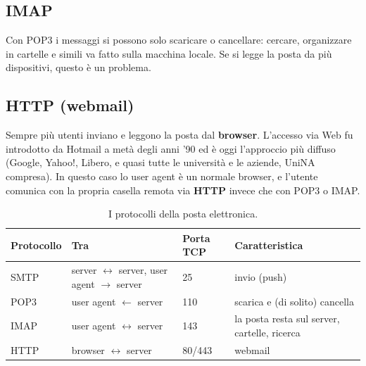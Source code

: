\subsection{IMAP}

Con POP3 i messaggi si possono solo scaricare o cancellare: cercare, organizzare in cartelle e simili va
fatto sulla macchina locale. Se si legge la posta da più dispositivi, questo è un problema.


\subsection{HTTP (webmail)}

Sempre più utenti inviano e leggono la posta dal \textbf{browser}. L'accesso via Web fu introdotto da
Hotmail a metà degli anni '90 ed è oggi l'approccio più diffuso (Google, Yahoo!, Libero, e quasi tutte le
università e le aziende, UniNA compresa). In questo caso lo user agent è un normale browser, e l'utente
comunica con la propria casella remota via \textbf{HTTP} invece che con POP3 o IMAP.


\begin{table}[H]
\centering
\begin{tabular}{llll}
\toprule
\textbf{Protocollo} & \textbf{Tra} & \textbf{Porta TCP} & \textbf{Caratteristica} \\
\midrule
SMTP & server $\leftrightarrow$ server, user agent $\rightarrow$ server & 25 & invio (push) \\
POP3 & user agent $\leftarrow$ server & 110 & scarica e (di solito) cancella \\
IMAP & user agent $\leftrightarrow$ server & 143 & la posta resta sul server, cartelle, ricerca \\
HTTP & browser $\leftrightarrow$ server & 80/443 & webmail \\
\bottomrule
\end{tabular}
\caption{I protocolli della posta elettronica.}
\end{table}

